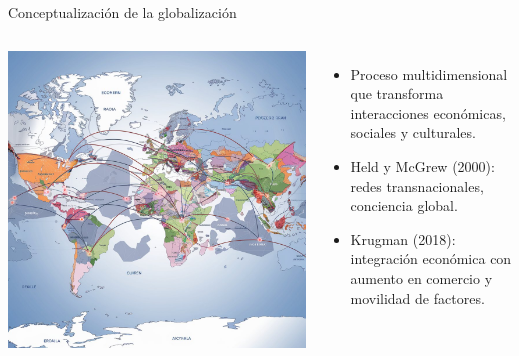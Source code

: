 \documentclass[aspectratio=169]{beamer}
\begin{document}
\begin{frame}{\Large Conceptualización de la globalización}
    \begin{columns}
            \includegraphics[width=\textwidth]{./images/global.jpeg} %
            \raggedleft %
            \Large
            \begin{itemize}
                \item Proceso multidimensional que transforma interacciones económicas, sociales y culturales.
                \item Held y McGrew (2000): redes transnacionales, conciencia global.
                \item Krugman (2018): integración económica con aumento en comercio y movilidad de factores.
            \end{itemize}
    \end{columns}
\end{frame}
\end{document}
